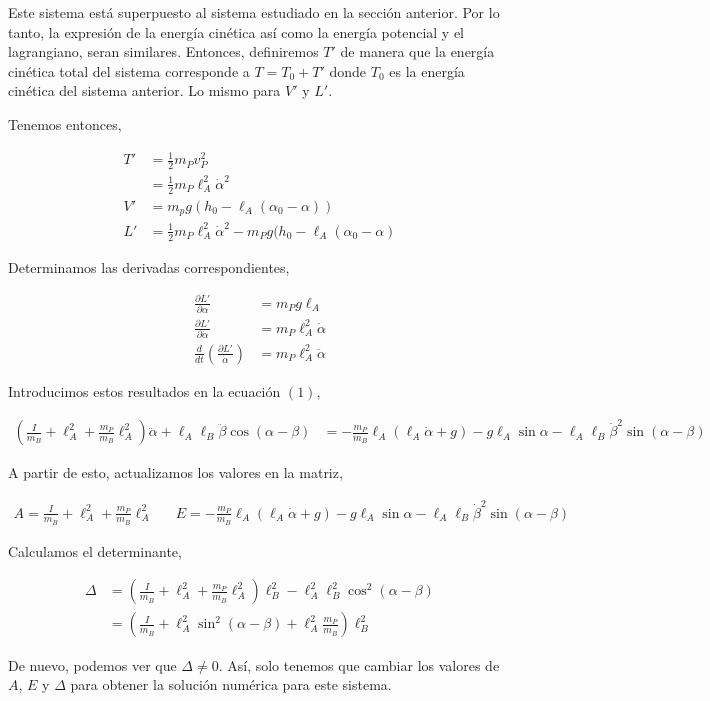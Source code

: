 \documentclass[10pt]{article}
\begin{document}
Este sistema está superpuesto al sistema estudiado en la sección anterior. Por lo tanto, la expresión de la energía cinética así como la
energía potencial y el lagrangiano, seran similares. Entonces, definiremos $T'$ de manera que la energía cinética total del sistema corresponde a
$T = T_0 + T'$ donde $T_0$ es la energía cinética del sistema anterior. Lo mismo para $V'$ y $L'$.

Tenemos entonces,

\begin{align*}
 T' &= \frac12 m_Pv^2_P \\
  &= \frac12 m_P\ell_A^2\dot{\alpha}^2 \\
  V' &= m_pg(h_0-\ell_A(\alpha_0-\alpha)) \\
  L' &= \frac12m_P\ell_A^2\dot{\alpha}^2 - m_Pg(h_0-\ell_A(\alpha_0-\alpha)
\end{align*}

Determinamos las derivadas correspondientes,

\begin{align*}
 \frac{\partial L'}{\partial \alpha} &= m_Pg\ell_A \\
 \frac{\partial L'}{\partial \dot{\alpha}} &= m_P\ell_A^2\dot{\alpha} \\
 \frac{d}{dt}\left(\frac{\partial L'}{\dot{\alpha}}\right) &= m_P\ell_A^2\ddot{\alpha} 
\end{align*}

Introducimos estos resultados en la ecuación $(1)$,

\begin{align}
  \left(\frac{I}{m_B}+\ell_A^2+\frac{m_P}{m_B}\ell_A^2\right)\ddot{\alpha} + \ell_A\ell_B\ddot{\beta}\cos{(\alpha-\beta)} &= -\frac{m_P}{m_B}\ell_A\left(\ell_A\dot{\alpha} + g\right)-g\ell_A\sin{\alpha}-\ell_A\ell_B\dot{\beta}^2\sin{(\alpha-\beta)}
\end{align}

A partir de esto, actualizamos los valores en la matriz,

\begin{align*}
 A = \frac{I}{m_B}+\ell_A^2+\frac{m_P}{m_B}\ell_A^2 && E = -\frac{m_P}{m_B}\ell_A\left(\ell_A\dot{\alpha} + g\right)-g\ell_A\sin{\alpha}-\ell_A\ell_B\dot{\beta}^2\sin{(\alpha-\beta)}
\end{align*}

Calculamos el determinante,

\begin{align*}
 \Delta &= \left(\frac{I}{m_B}+\ell_A^2+\frac{m_P}{m_B}\ell_A^2\right)\ell_B^2 -\ell_A^2\ell_B^2\cos^2{(\alpha-\beta)} \\
	&= \left(\frac{I}{m_B}+\ell_A^2\sin^2{(\alpha-\beta)}+\ell_A^2\frac{m_P}{m_B}\right)\ell_B^2
\end{align*}

De nuevo, podemos ver que $\Delta \neq 0$. Así, solo tenemos que cambiar los valores de $A$, $E$ y $\Delta$  para obtener la solución numérica para
este sistema.
\end{document}
